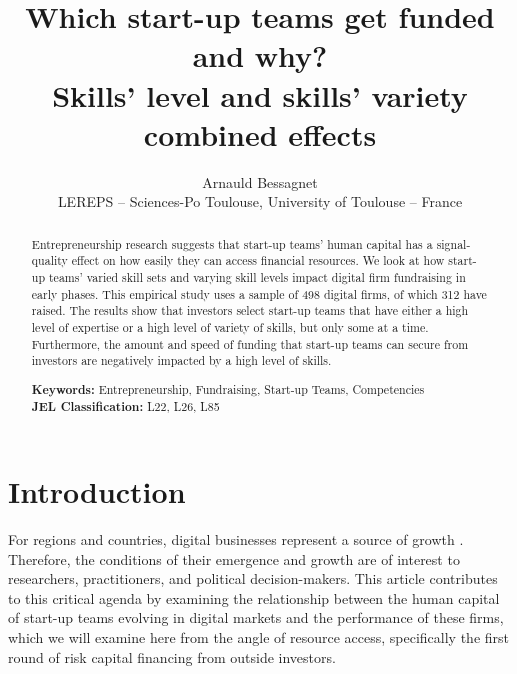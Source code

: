 \documentclass[12pt]{article}
\begin{document}
\title{Which start-up teams get funded and why? \\ Skills' level and skills' variety combined effects}
\date{\vspace{-3ex}}
\author{Arnauld Bessagnet \\ \footnotesize{LEREPS – Sciences-Po Toulouse, University of Toulouse – France} \\}

\maketitle \vspace{-1,5em}

\begin{abstract}
\noindent
Entrepreneurship research suggests that start-up teams' human capital has a signal-quality effect on how easily they can access financial resources. We look at how start-up teams' varied skill sets and varying skill levels impact digital firm fundraising in early phases. This empirical study uses a sample of 498 digital firms, of which 312 have raised. The results show that investors select start-up teams that have either a high level of expertise or a high level of variety of skills, but only some at a time. Furthermore, the amount and speed of funding that start-up teams can secure from investors are negatively impacted by a high level of skills.
\newline

\begin{obeylines}
\noindent \footnotesize{}{\textbf{Keywords:} Entrepreneurship, Fundraising, Start-up Teams, Competencies}
\noindent \footnotesize{\textbf{JEL Classification:} L22, L26, L85}
\end{obeylines}

\end{abstract}

\clearpage
\section{Introduction}

For regions and countries, digital businesses represent a source of growth \citep{autio2016entrepreneurship}. Therefore, the conditions of their emergence and growth are of interest to researchers, practitioners, and political decision-makers. This article contributes to this critical agenda by examining the relationship between the human capital of start-up teams evolving in digital markets and the performance of these firms, which we will examine here from the angle of resource access, specifically the first round of risk capital financing from outside investors.
\end{document}
